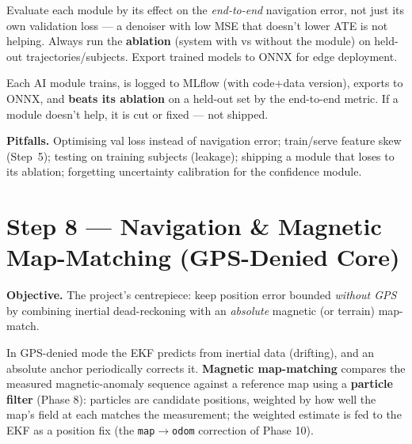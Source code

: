 \documentclass[11pt]{article}
\begin{document}
\begin{defbox}
Evaluate each module by its effect on the \emph{end-to-end} navigation error, not just its own
validation loss --- a denoiser with low MSE that doesn't lower ATE is not helping. Always run the
\textbf{ablation} (system with vs without the module) on held-out trajectories/subjects. Export
trained models to ONNX for edge deployment.
\end{defbox}

\begin{dodbox}
Each AI module trains, is logged to MLflow (with code+data version), exports to ONNX, and
\textbf{beats its ablation} on a held-out set by the end-to-end metric. If a module doesn't help,
it is cut or fixed --- not shipped.
\end{dodbox}

\textbf{Pitfalls.} Optimising val loss instead of navigation error; train/serve feature skew
(Step~5); testing on training subjects (leakage); shipping a module that loses to its ablation;
forgetting uncertainty calibration for the confidence module.

\section{Step 8 --- Navigation \& Magnetic Map-Matching (GPS-Denied Core)}\label{sec:nav}

\textbf{Objective.} The project's centrepiece: keep position error bounded \emph{without GPS} by
combining inertial dead-reckoning with an \emph{absolute} magnetic (or terrain) map-match.

\begin{defbox}
In GPS-denied mode the EKF predicts from inertial data (drifting), and an absolute anchor
periodically corrects it. \textbf{Magnetic map-matching} compares the measured magnetic-anomaly
sequence against a reference map using a \textbf{particle filter} (Phase 8): particles are
candidate positions, weighted by how well the map's field at each matches the measurement; the
weighted estimate is fed to the EKF as a position fix (the \texttt{map}$\to$\texttt{odom}
correction of Phase 10).
\end{defbox}
\end{document}
